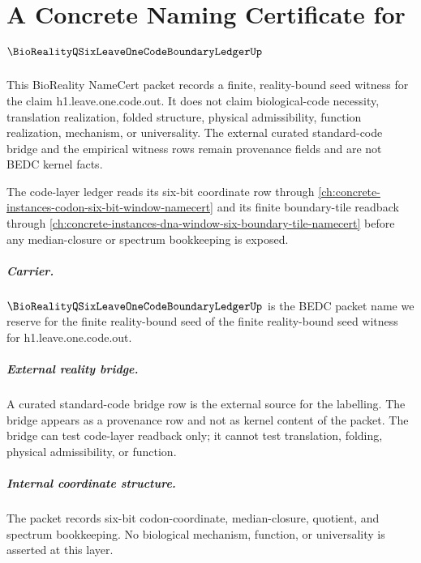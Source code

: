 \chapter{A Concrete Naming Certificate for $\BioRealityQSixLeaveOneCodeBoundaryLedgerUp$}
\label{ch:concrete-instances-bioreality_q_six_leave_one_code_boundary_ledger-namecert}

This BioReality NameCert packet records a finite, reality-bound seed
witness for the claim h1.leave.one.code.out. It does not claim biological-code
necessity, translation realization, folded structure, physical
admissibility, function realization, mechanism, or universality. The
external curated standard-code bridge and the empirical witness rows
remain provenance fields and are not BEDC kernel facts.

The code-layer ledger reads its six-bit coordinate row through \autoref{ch:concrete-instances-codon-six-bit-window-namecert} and its finite boundary-tile readback through \autoref{ch:concrete-instances-dna-window-six-boundary-tile-namecert} before any median-closure or spectrum bookkeeping is exposed.

\paragraph{Carrier.} $\BioRealityQSixLeaveOneCodeBoundaryLedgerUp$ is the BEDC packet name we
reserve for the finite reality-bound seed of the finite reality-bound seed witness for h1.leave.one.code.out.

\paragraph{External reality bridge.} A curated standard-code bridge
row is the external source for the labelling. The bridge appears as a
provenance row and not as kernel content of the packet. The bridge can
test code-layer readback only; it cannot test translation, folding,
physical admissibility, or function.

\paragraph{Internal coordinate structure.} The packet records six-bit
codon-coordinate, median-closure, quotient, and spectrum bookkeeping.
No biological mechanism, function, or universality is asserted at this
layer.

